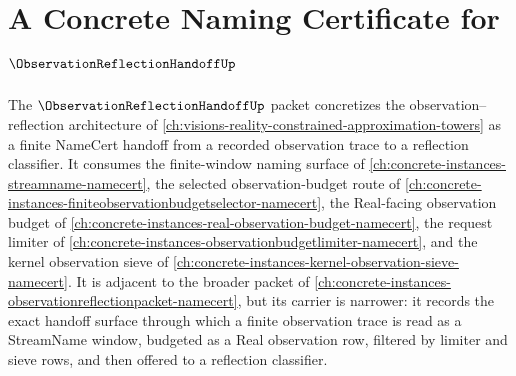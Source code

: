 \chapter{A Concrete Naming Certificate for $\ObservationReflectionHandoffUp$}
\label{ch:concrete-instances-observation-reflection-handoff-namecert}

The $\ObservationReflectionHandoffUp$ packet concretizes the observation--reflection architecture of \autoref{ch:visions-reality-constrained-approximation-towers} as a finite NameCert handoff from a recorded observation trace to a reflection classifier. It consumes the finite-window naming surface of \autoref{ch:concrete-instances-streamname-namecert}, the selected observation-budget route of \autoref{ch:concrete-instances-finiteobservationbudgetselector-namecert}, the Real-facing observation budget of \autoref{ch:concrete-instances-real-observation-budget-namecert}, the request limiter of \autoref{ch:concrete-instances-observationbudgetlimiter-namecert}, and the kernel observation sieve of \autoref{ch:concrete-instances-kernel-observation-sieve-namecert}. It is adjacent to the broader packet of \autoref{ch:concrete-instances-observationreflectionpacket-namecert}, but its carrier is narrower: it records the exact handoff surface through which a finite observation trace is read as a StreamName window, budgeted as a Real observation row, filtered by limiter and sieve rows, and then offered to a reflection classifier.

